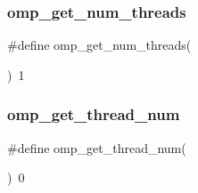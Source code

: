 \subsubsection{\texorpdfstring{omp\+\_\+get\+\_\+num\+\_\+threads}{omp\_get\_num\_threads}}
{\footnotesize\ttfamily \#define omp\+\_\+get\+\_\+num\+\_\+threads(\begin{DoxyParamCaption}{ }\end{DoxyParamCaption})~1}

\mbox{\label{mrci-no_8cc_a889ec205c635b219999c761b28cc39ba}} 
\subsubsection{\texorpdfstring{omp\+\_\+get\+\_\+thread\+\_\+num}{omp\_get\_thread\_num}}
{\footnotesize\ttfamily \#define omp\+\_\+get\+\_\+thread\+\_\+num(\begin{DoxyParamCaption}{ }\end{DoxyParamCaption})~0}

